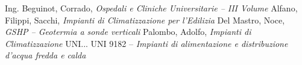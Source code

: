 \begin{thebibliography}{9}
	Ing. Beguinot, Corrado, \emph{Ospedali e Cliniche Universitarie -- III Volume}
	Alfano, Filippi, Sacchi, \emph{Impianti di Climatizzazione per l'Edilizia}
	Del Mastro, Noce, \emph{GSHP -- Geotermia a sonde verticali}
	Palombo, Adolfo, \emph{Impianti di Climatizzazione}
	 UNI...
	 UNI 9182 -- \emph{Impianti di alimentazione e distribuzione d'acqua fredda e calda}
\end{thebibliography}
\thispagestyle{empty}